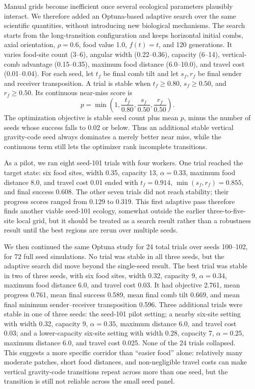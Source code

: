 \documentclass[11pt]{article}
\begin{document}
Manual grids become inefficient once several ecological parameters plausibly
interact. We therefore added an Optuna-based adaptive search over the same
scientific quantities, without introducing new biological mechanisms. The
search starts from the long-transition configuration and keeps horizontal
initial combs, axial orientation, $\rho=0.6$, food value 1.0, $f(t)=t$, and
120 generations. It varies food-site count (3--6), angular width
(0.22--0.36), capacity (6--14), vertical-comb advantage (0.15--0.35),
maximum food distance (6.0--10.0), and travel cost (0.01--0.04). For each
seed, let $t_f$ be final comb tilt and let $s_f,r_f$ be final sender and
receiver transposition. A trial is stable when
$t_f \geq 0.80$, $s_f \geq 0.50$, and $r_f \geq 0.50$. Its continuous
near-miss score is
\[
p = \min\left(1, \frac{t_f}{0.80}, \frac{s_f}{0.50}, \frac{r_f}{0.50}\right).
\]
The optimization objective is stable seed count plus mean $p$, minus the
number of seeds whose success falls to 0.02 or below. Thus an additional stable
vertical gravity-code seed always dominates a merely better near miss, while
the continuous term still lets the optimizer rank incomplete transitions.

As a pilot, we ran eight seed-101 trials with four workers. One trial reached
the target state: six food sites, width 0.35, capacity 13,
$\alpha=0.33$, maximum food distance 8.0, and travel cost 0.01 ended with
$t_f=0.914$, $\min(s_f,r_f)=0.855$, and final success 0.608. The other seven
trials did not reach stability; their progress scores ranged from 0.129 to
0.319. This first adaptive pass therefore finds another viable seed-101
ecology, somewhat outside the earlier three-to-five-site local grid, but it
should be treated as a search result rather than a robustness result until the
best regions are rerun over multiple seeds.

We then continued the same Optuna study for 24 total trials over seeds
100--102, for 72 full seed simulations. No trial was stable in all three
seeds, but the adaptive search did move beyond the single-seed result. The
best trial was stable in two of three seeds, with six food sites, width 0.32,
capacity 9, $\alpha=0.34$, maximum food distance 6.0, and travel cost 0.03.
It had objective 2.761, mean progress 0.761, mean final success 0.589, mean
final comb tilt 0.669, and mean final minimum sender--receiver transposition
0.596. Three additional trials were stable in one of three seeds: the seed-101
pilot setting; a nearby six-site setting with width 0.32, capacity 9,
$\alpha=0.35$, maximum distance 6.0, and travel cost 0.03; and a lower-capacity
six-site setting with width 0.28, capacity 7, $\alpha=0.25$, maximum distance
6.0, and travel cost 0.025. None of the 24 trials collapsed. This suggests a
more specific corridor than ``easier food'' alone: relatively many moderate
patches, short food distances, and non-negligible travel costs can make
vertical gravity-code transitions repeat across more than one seed, but the
transition is still not reliable across the small seed panel.
\end{document}
